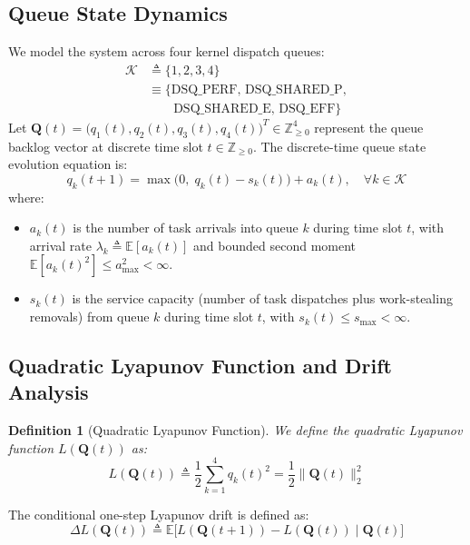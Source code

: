 \documentclass[conference]{IEEEtran}
\newtheorem{definition}{Definition}
\begin{document}
\subsection{Queue State Dynamics}
We model the system across four kernel dispatch queues:
\begin{align}
\mathcal{K} &\triangleq \{1, 2, 3, 4\} \nonumber \\
&\equiv \{\mathrm{DSQ\_PERF}, \, \mathrm{DSQ\_SHARED\_P}, \nonumber \\
&\quad\quad \mathrm{DSQ\_SHARED\_E}, \, \mathrm{DSQ\_EFF}\}
\end{align}
Let $\mathbf{Q}(t) = \big( q_1(t), q_2(t), q_3(t), q_4(t) \big)^T \in \mathbb{Z}_{\ge 0}^4$ represent the queue backlog vector at discrete time slot $t \in \mathbb{Z}_{\ge 0}$.
The discrete-time queue state evolution equation is:
\begin{equation}
\label{eq:queue_evol}
q_k(t+1) = \max\Big(0, \; q_k(t) - s_k(t)\Big) + a_k(t), \quad \forall k \in \mathcal{K}
\end{equation}
where:
\begin{itemize}
    \item $a_k(t)$ is the number of task arrivals into queue $k$ during time slot $t$, with arrival rate $\lambda_k \triangleq \mathbb{E}[a_k(t)]$ and bounded second moment $\mathbb{E}[a_k(t)^2] \le a_{\max}^2 < \infty$.
    \item $s_k(t)$ is the service capacity (number of task dispatches plus work-stealing removals) from queue $k$ during time slot $t$, with $s_k(t) \le s_{\max} < \infty$.
\end{itemize}

\subsection{Quadratic Lyapunov Function and Drift Analysis}
\begin{definition}[Quadratic Lyapunov Function]
We define the quadratic Lyapunov function $L(\mathbf{Q}(t))$ as:
\begin{equation}
\label{eq:lyapunov_func}
L(\mathbf{Q}(t)) \triangleq \frac{1}{2} \sum_{k=1}^4 q_k(t)^2 = \frac{1}{2} \|\mathbf{Q}(t)\|_2^2
\end{equation}
\end{definition}

The conditional one-step Lyapunov drift is defined as:
\begin{equation}
\Delta L(\mathbf{Q}(t)) \triangleq \mathbb{E}\Big[ L(\mathbf{Q}(t+1)) - L(\mathbf{Q}(t)) \;\Big|\; \mathbf{Q}(t) \Big]
\end{equation}
\end{document}
